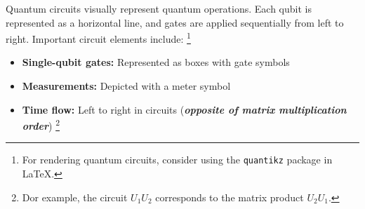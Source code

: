 Quantum circuits visually represent quantum operations. Each qubit is
represented as a horizontal line, and gates are applied sequentially from
left to right. Important circuit elements include: \footnote{For rendering
quantum circuits, consider using the \texttt{quantikz} package in \LaTeX.}

\begin{itemize}

  \item \textbf{Single-qubit gates:} Represented as boxes with gate symbols

  \item \textbf{Measurements:} Depicted with a meter symbol

  \item \textbf{Time flow:} Left to right in circuits (\textit{\textbf{opposite
    of matrix multiplication order}}) \footnote {
      Dor example, the circuit $U_1U_2$ corresponds to the
      matrix product $U_2U_1$.
  }

\end{itemize}


